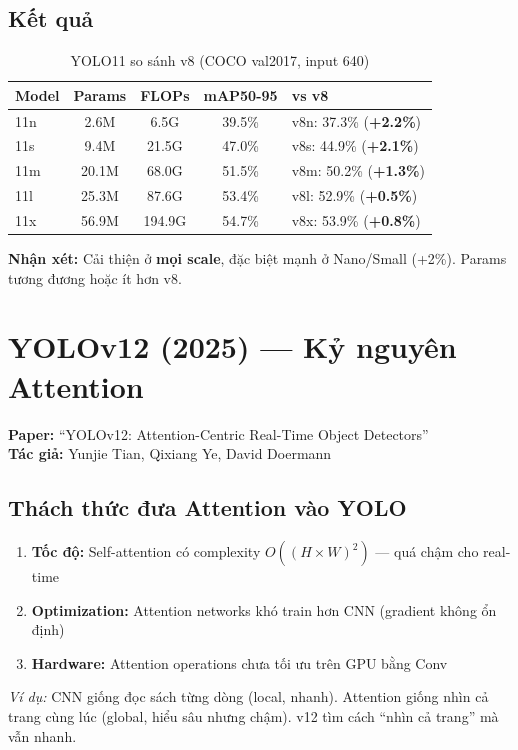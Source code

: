 \subsection{Kết quả}
\begin{table}[H]\centering
\caption{YOLO11 so sánh v8 (COCO val2017, input 640)}
\begin{tabular}{lcccl}\toprule
\textbf{Model} & \textbf{Params} & \textbf{FLOPs} & \textbf{mAP50-95} & \textbf{vs v8}\\\midrule
11n & 2.6M & 6.5G & 39.5\% & v8n: 37.3\% (\textbf{+2.2\%}) \\
11s & 9.4M & 21.5G & 47.0\% & v8s: 44.9\% (\textbf{+2.1\%}) \\
11m & 20.1M & 68.0G & 51.5\% & v8m: 50.2\% (\textbf{+1.3\%}) \\
11l & 25.3M & 87.6G & 53.4\% & v8l: 52.9\% (\textbf{+0.5\%}) \\
11x & 56.9M & 194.9G & 54.7\% & v8x: 53.9\% (\textbf{+0.8\%}) \\\bottomrule
\end{tabular}
\end{table}

\textbf{Nhận xét:} Cải thiện ở \textbf{mọi scale}, đặc biệt mạnh ở Nano/Small (+2\%). Params tương đương hoặc ít hơn v8.

\section{YOLOv12 (2025) --- Kỷ nguyên Attention}
\textbf{Paper:} ``YOLOv12: Attention-Centric Real-Time Object Detectors''\\
\textbf{Tác giả:} Yunjie Tian, Qixiang Ye, David Doermann

\subsection{Thách thức đưa Attention vào YOLO}
\begin{enumerate}
    \item \textbf{Tốc độ:} Self-attention có complexity $O((H\times W)^2)$ --- quá chậm cho real-time
    \item \textbf{Optimization:} Attention networks khó train hơn CNN (gradient không ổn định)
    \item \textbf{Hardware:} Attention operations chưa tối ưu trên GPU bằng Conv
\end{enumerate}

\textit{Ví dụ:} CNN giống đọc sách từng dòng (local, nhanh). Attention giống nhìn cả trang cùng lúc (global, hiểu sâu nhưng chậm). v12 tìm cách ``nhìn cả trang'' mà vẫn nhanh.


